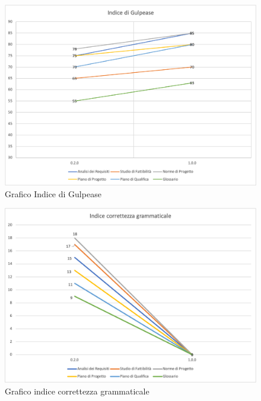 \begin{center}
   
		\begin{figure}[!htb]
			\centering
			\includegraphics[scale=0.80]{res/images/grafico_gulpease.png}	
			\caption{Grafico Indice di Gulpease}
        \end{figure}
        

        \begin{figure}[!htb]
			\centering
			\includegraphics[scale=0.80]{res/images/grafico_correttezza.png}	
			\caption{Grafico indice correttezza grammaticale}
		\end{figure}
	




    \begin{center}
        

\end{center}
\end{center}
